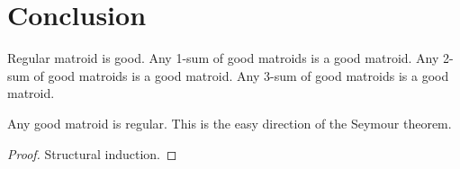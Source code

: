 \chapter{Conclusion}

\begin{definition}
    \label{Matroid.IsGood}
    \leanok
    Regular matroid is good. %
    Any 1-sum of good matroids is a good matroid.
    Any 2-sum of good matroids is a good matroid.
    Any 3-sum of good matroids is a good matroid.
\end{definition}

\begin{corollary}
    \label{Matroid.IsGood.isRegular}
    \leanok
    Any good matroid is regular. This is the easy direction of the Seymour theorem.
\end{corollary}

\begin{proof}
    \leanok
    Structural induction.
\end{proof}
